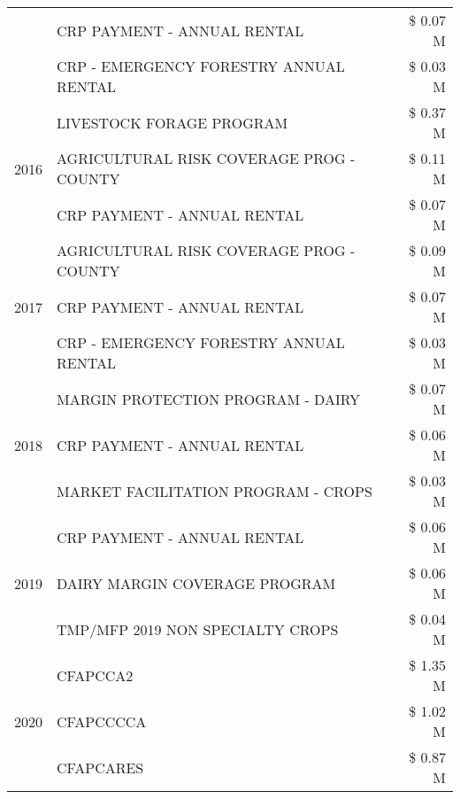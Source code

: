 \begin{tabular}{llr}
 & CRP PAYMENT - ANNUAL RENTAL & \$ 0.07 M \\
 & CRP - EMERGENCY FORESTRY ANNUAL RENTAL & \$ 0.03 M \\
\cline{1-3}
\multirow[t]{3}{*}{2016} & LIVESTOCK FORAGE PROGRAM & \$ 0.37 M \\
 & AGRICULTURAL RISK COVERAGE PROG - COUNTY & \$ 0.11 M \\
 & CRP PAYMENT - ANNUAL RENTAL & \$ 0.07 M \\
\cline{1-3}
\multirow[t]{3}{*}{2017} & AGRICULTURAL RISK COVERAGE PROG - COUNTY & \$ 0.09 M \\
 & CRP PAYMENT - ANNUAL RENTAL & \$ 0.07 M \\
 & CRP - EMERGENCY FORESTRY ANNUAL RENTAL & \$ 0.03 M \\
\cline{1-3}
\multirow[t]{3}{*}{2018} & MARGIN PROTECTION PROGRAM - DAIRY & \$ 0.07 M \\
 & CRP PAYMENT - ANNUAL RENTAL & \$ 0.06 M \\
 & MARKET FACILITATION PROGRAM - CROPS & \$ 0.03 M \\
\cline{1-3}
\multirow[t]{3}{*}{2019} & CRP PAYMENT - ANNUAL RENTAL & \$ 0.06 M \\
 & DAIRY MARGIN COVERAGE PROGRAM & \$ 0.06 M \\
 & TMP/MFP 2019 NON SPECIALTY CROPS & \$ 0.04 M \\
\cline{1-3}
\multirow[t]{3}{*}{2020} & CFAPCCA2 & \$ 1.35 M \\
 & CFAPCCCCA & \$ 1.02 M \\
 & CFAPCARES & \$ 0.87 M \\
\cline{1-3}
\bottomrule
\end{tabular}
